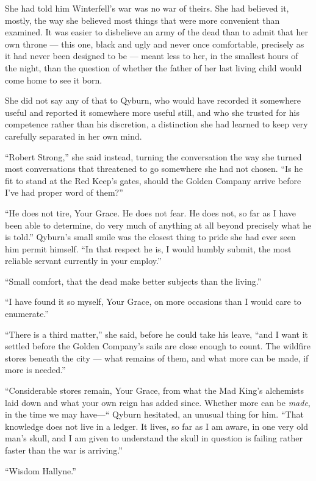 She had told him Winterfell’s war was no war of theirs. She had believed it, mostly, the way she believed most things that were more convenient than examined. It was easier to disbelieve an army of the dead than to admit that her own throne — this one, black and ugly and never once comfortable, precisely as it had never been designed to be — meant less to her, in the smallest hours of the night, than the question of whether the father of her last living child would come home to see it born.

She did not say any of that to Qyburn, who would have recorded it somewhere useful and reported it somewhere more useful still, and who she trusted for his competence rather than his discretion, a distinction she had learned to keep very carefully separated in her own mind.

“Robert Strong,” she said instead, turning the conversation the way she turned most conversations that threatened to go somewhere she had not chosen. “Is he fit to stand at the Red Keep’s gates, should the Golden Company arrive before I’ve had proper word of them?”

“He does not tire, Your Grace. He does not fear. He does not, so far as I have been able to determine, do very much of anything at all beyond precisely what he is told.” Qyburn’s small smile was the closest thing to pride she had ever seen him permit himself. “In that respect he is, I would humbly submit, the most reliable servant currently in your employ.”

“Small comfort, that the dead make better subjects than the living.”

“I have found it so myself, Your Grace, on more occasions than I would care to enumerate.”

“There is a third matter,” she said, before he could take his leave, “and I want it settled before the Golden Company’s sails are close enough to count. The wildfire stores beneath the city — what remains of them, and what more can be made, if more is needed.”

“Considerable stores remain, Your Grace, from what the Mad King’s alchemists laid down and what your own reign has added since. Whether more can be \textit{made}, in the time we may have—“ Qyburn hesitated, an unusual thing for him. “That knowledge does not live in a ledger. It lives, so far as I am aware, in one very old man’s skull, and I am given to understand the skull in question is failing rather faster than the war is arriving.”

“Wisdom Hallyne.”

